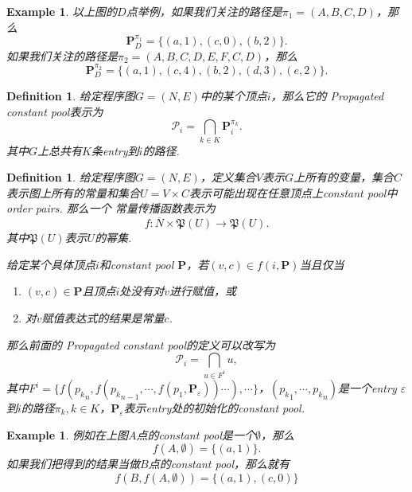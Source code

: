 \documentclass{article}
\newtheorem{example}[theorem]{Example}
\newtheorem{definition}[theorem]{Definition}
\newcommand*{\xfunc}[4]{{#2}\colon{#3}{#1}{#4}}
\newcommand*{\func}[3]{\xfunc{\to}{#1}{#2}{#3}}
\begin{document}

\begin{example} 
\rm 以上图的$D$点举例，如果我们关注的路径是$\pi_1 = (A,B,C,D)$，那么
$$
\mathbf{P}_D^{\pi_1} = \{(a,1),(c,0),(b,2)\}.
$$
如果我们关注的路径是$\pi_2 = (A,B,C,D,E,F,C,D)$，那么
$$
\mathbf{P}_D^{\pi_2} = \{(a,1),(c,4),(b,2),(d,3),(e,2)\}.
$$
\end{example}


\begin{definition}
\rm 给定程序图$G = (N,E)$中的某个顶点$i$，那么它的{\color{red} Propagated constant pool}表示为
$$
\mathcal{P}_{i} = \bigcap\limits_{k \in K} \mathbf{P}_i^{\pi_k}.
$$
其中$G$上总共有$K$条entry到$i$的路径.
\end{definition}

\begin{definition}
\rm 给定程序图$G=(N,E)$，定义集合$V$表示$G$上所有的变量，集合$C$表示图上所有的常量和集合$U = V \times C$表示可能出现在任意顶点上constant pool中order pairs. 那么一个{\color{red} 常量传播函数}表示为
$$
\func{f}{\overline{N} \times \mathfrak{P}(U)}{\mathfrak{P}(U)}. 
$$
其中$\mathfrak{P}(U)$表示$U$的幂集.

给定某个具体顶点$i$和constant pool $\mathbf{P}$，若$(v,c) \in f(i,\mathbf{P})$当且仅当

\begin{enumerate}
	\item $(v,c) \in \mathbf{P}$且顶点$i$处没有对$v$进行赋值，或
	\item 对$v$赋值表达式的结果是常量$c$.  
\end{enumerate}

那么前面的{\color{red} Propagated constant pool}的定义可以改写为
$$
\mathcal{P}_i  = \bigcap\limits_{u \in F^{i}} u,
$$
其中$F^{i} = \{f({p_k}_n,f({p_k}_{n-1},\cdots,f(p_1,\mathbf{P}_{\varepsilon}))\cdots),\cdots\}$，$({p_k}_1,\cdots,{p_k}_n)$是一个entry $\varepsilon$到$i$的路径$\pi_k, k \in K$，$\mathbf{P}_{\varepsilon}$表示entry处的初始化的constant pool.
\end{definition}

\begin{example}
\rm 例如在上图$A$点的constant pool是一个$\emptyset$，那么
$$
f(A,\emptyset) = \{(a,1)\}.$$
如果我们把得到的结果当做$B$点的constant pool，那么就有
$$
f(B,f(A,\emptyset)) = \{(a,1),(c,0)\}
$$
\end{example}
\end{document}
